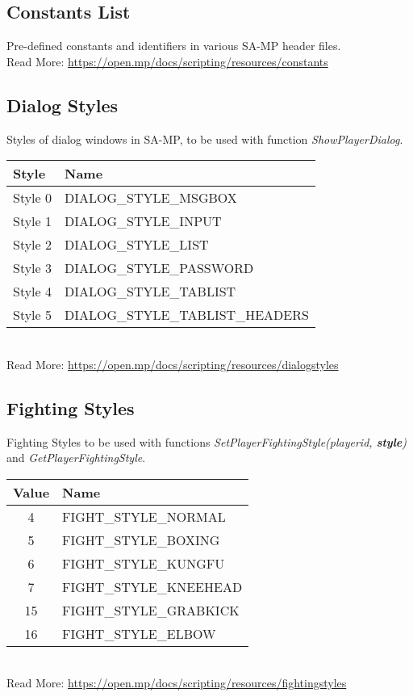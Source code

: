 \documentclass{article}
\begin{document}
\subsection{Constants List}
Pre-defined constants and identifiers in various SA-MP header files.
\bigskip
\\Read More: \url{https://open.mp/docs/scripting/resources/constants}

\subsection{Dialog Styles}
Styles of dialog windows in SA-MP, to be used with function \textit{ShowPlayerDialog}.
\bigskip
\\\begin{tabular}{ |l|l| } 
\hline
Style & Name \\
\hline
Style 0 & DIALOG\_STYLE\_MSGBOX \\
Style 1 & DIALOG\_STYLE\_INPUT \\
Style 2 & DIALOG\_STYLE\_LIST \\
Style 3 & DIALOG\_STYLE\_PASSWORD \\
Style 4 & DIALOG\_STYLE\_TABLIST \\
Style 5 & DIALOG\_STYLE\_TABLIST\_HEADERS \\
\hline
\end{tabular}
\bigskip
\\Read More: \url{https://open.mp/docs/scripting/resources/dialogstyles}

\subsection{Fighting Styles}
\begin{sloppypar}
Fighting Styles to be used with functions \textit{SetPlayerFightingStyle(playerid, \textbf{style})} and \textit{GetPlayerFightingStyle}.
\end{sloppypar}
\bigskip
\noindent\begin{tabular}{ |c|l| } 
\hline
Value & Name \\
\hline
4 & FIGHT\_STYLE\_NORMAL \\
5 & FIGHT\_STYLE\_BOXING \\
6 & FIGHT\_STYLE\_KUNGFU \\
7 & FIGHT\_STYLE\_KNEEHEAD \\
15 & FIGHT\_STYLE\_GRABKICK \\
16 & FIGHT\_STYLE\_ELBOW \\
\hline
\end{tabular}
\bigskip
\\Read More: \url{https://open.mp/docs/scripting/resources/fightingstyles}
\end{document}
